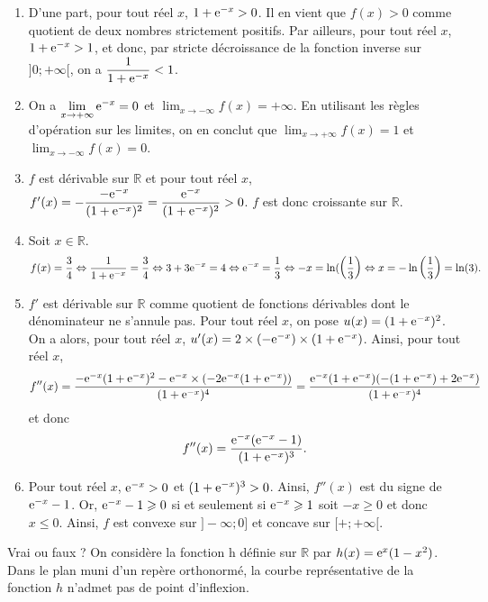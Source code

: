 \documentclass[11pt,fleqn, openany]{book} %
\begin{document}
\begin{solution}\hspace{0pt} 
\begin{enumerate}
\item D'une part, pour tout réel $x$, $1+\mathrm{e}^{-x}>0$. Il en vient que $f(x)>0$ comme quotient de deux nombres strictement positifs. Par ailleurs, pour tout réel $x$, $1+\mathrm{e}^{-x}>1$, et donc, par stricte décroissance de la fonction inverse sur $]0;+\infty[$, on a $\dfrac{1}{1+\mathrm{e}^{-x}}<1$.
\item On a $\displaystyle\lim_{x\to+\infty}\mathrm{e}^{-x}=0$ et $\displaystyle\lim_{x\to -\infty}f(x)=+\infty$. En utilisant les règles d'opération sur les limites, on en conclut que $\displaystyle\lim_{x\to +\infty}f(x)=1$ et $\displaystyle\lim_{x\to -\infty}f(x)=0$.
\item $f$ est dérivable sur $\mathbb{R}$ et pour tout réel $x$, $f'(x)=-\dfrac{-\mathrm{e}^{-x}}{(1+\mathrm{e}^{-x})^2}=\dfrac{\mathrm{e}^{-x}}{(1+\mathrm{e}^{-x})^2}>0$. $f$ est donc croissante sur $\mathbb{R}$.
\item Soit $x\in\mathbb{R}$.
\[f(x)=\dfrac{3}{4}\Leftrightarrow \dfrac{1}{1+\mathrm{e}^{-x}} = \dfrac{3}{4} \Leftrightarrow 3+3\mathrm{e}^{-x} = 4 \Leftrightarrow \mathrm{e}^{-x}=\dfrac{1}{3} \Leftrightarrow -x=\ln(\left(\dfrac{1}{3}\right) \Leftrightarrow x = -\ln\left(\dfrac{1}{3}\right)=\ln(3).\]
\item $f'$ est dérivable sur $\mathbb{R}$ comme quotient de fonctions dérivables dont le dénominateur ne s'annule pas. Pour tout réel $x$, on pose $u(x)=(1+\mathrm{e}^{-x})^2$. On a alors, pour tout réel $x$, $u'(x)=2 \times (-\mathrm{e}^{-x}) \times (1+\mathrm{e}^{-x})$. Ainsi, pour tout réel $x$,
\[f''(x)=\dfrac{-\mathrm{e}^{-x}(1+\mathrm{e}^{-x})^2-\mathrm{e}^{-x}\times(-2\mathrm{e}^{-x}(1+\mathrm{e}^{-x}))}{(1+\mathrm{e}^{-x})^4}=\dfrac{\mathrm{e}^{-x}(1+\mathrm{e}^{-x})(-(1+\mathrm{e}^{-x})+2\mathrm{e}^{-x})}{(1+\mathrm{e}^{-x})^4}\]
et donc 
\[f''(x)=\dfrac{\mathrm{e}^{-x}(\mathrm{e}^{-x}-1)}{(1+\mathrm{e}^{-x})^3}.\]
\item Pour tout réel $x$, $\mathrm{e}^{-x}>0$ et $(1+\mathrm{e}^{-x})^3>0$. Ainsi, $f''(x)$ est du signe de $\mathrm{e}^{-x}-1$. Or, $\mathrm{e}^{-x}-1\geqslant 0$ si et seulement si $\mathrm{e}^{-x}\geqslant 1$ soit $-x\geqslant 0$ et donc $x\leqslant 0$. Ainsi, $f$ est convexe sur $]-\infty;0]$ et concave sur $[+;+\infty[$.
\end{enumerate}\end{solution}



\begin{exercise}[topic=cvx02, subtitle={(Amérique du Nord 2022)}]Vrai ou faux ? On considère la fonction h définie sur $\mathbb{R}$ par  $h(x) = \mathrm{e}^x(1-x^2)$. Dans le plan muni d'un repère orthonormé, la courbe représentative de la fonction $h$ n'admet pas de point d'inflexion.\end{exercise}
\end{document}
